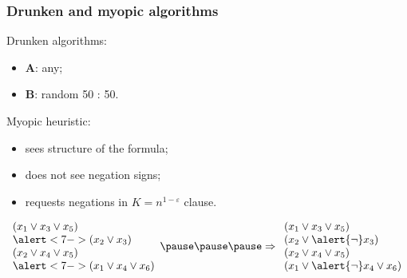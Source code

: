 \begin{frame}
	\frametitle{Drunken and myopic algorithms}
    \pause

    \begin{definition}
        Drunken algorithms:
        \begin{itemize}
	        \item $\mathbf{A}$: any;
	        \item $\mathbf{B}$: random  50 : 50.
        \end{itemize}
    \end{definition}

    \pause
    \begin{definition}
        Myopic heuristic:
        \pause
        \begin{itemize}
            \item sees structure of the formula;
            \pause
            \item does not see negation signs;
            \item<6-> requests negations in $K = n^{1 - \varepsilon}$ clause.
        \end{itemize}
    \end{definition}

    \pause
    $\begin{array}{l}
        (x_1 \vee x_3 \vee x_5) \\
        \alert<7->{(x_2 \vee x_3)} \\
        (x_2 \vee x_4 \vee x_5) \\
        \alert<7->{(x_1 \vee x_4 \vee x_6)} \\
    \end{array}
    \pause
    \pause
    \pause
    \Rightarrow
    \begin{array}{l}
        (x_1 \vee x_3 \vee x_5) \\
        (x_2 \vee \alert{\neg} x_3) \\
        (x_2 \vee x_4 \vee x_5) \\
        (x_1 \vee \alert{\neg} x_4 \vee x_6) \\
    \end{array}$
    
\end{frame}


